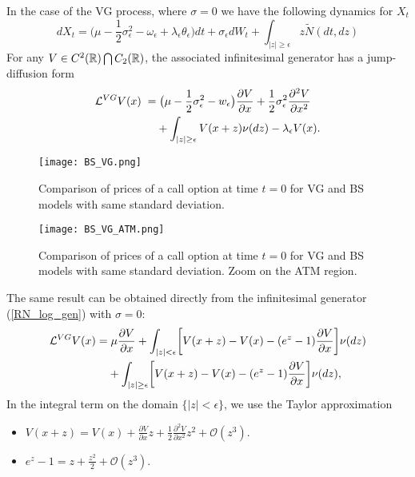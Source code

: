 In the case of the VG process, where $\sigma = 0$ we have the following dynamics for $X_t$
\begin{equation}\label{log_sde_VG}
dX_t = \biggl( \mu - \frac{1}{2} \sigma_{\epsilon}^2 - \omega_{\epsilon} + \lambda_{\epsilon} \theta_{\epsilon}  \biggr) dt 
       + \sigma_{\epsilon} dW_t + \int_{|z|\geq \epsilon} z \tilde N(dt,dz)
\end{equation}
For any $V\in C^2(\mathbb{R}) \bigcap C_2(\mathbb{R})$, the associated infinitesimal generator has a jump-diffusion form
\begin{align}\label{VG_inf_gen}
\mathcal{L}^{VG} V(x) \; =& \; \bigl( \mu-\frac{1}{2}\sigma_{\epsilon}^2 - w_{\epsilon} \bigr) \frac{\partial V}{\partial x} 
+ \frac{1}{2}\sigma_{\epsilon}^2 \frac{\partial^2 V}{\partial x^2} \\ \nonumber
&+ \int_{|z| \geq \epsilon} V(x+z) \nu(dz) - \lambda_{\epsilon} V(x).
\end{align}
\begin{figure}[t]
   \centering
   \texttt{[image: BS\_VG.png]}
   \caption{Comparison of prices of a call option at time $t=0$ for VG and BS models with same standard deviation.}
   \label{BS_VG} 
 \end{figure}
 \begin{figure}[t]
   \texttt{[image: BS\_VG\_ATM.png]}
   \caption{Comparison of prices of a call option at time $t=0$ for VG and BS models with same standard deviation. Zoom on the ATM region.}
   \label{BS_VG_ATM}
\end{figure}
The same result can be obtained directly from the infinitesimal generator (\ref{RN_log_gen}) with $\sigma =0$:
\begin{align*}
\mathcal{L}^{VG} V(x) =& \; \mu \frac{\partial V}{\partial x}
+ \int_{|z| < \epsilon}
\biggl[ V(x+z) - V(x) - (e^z-1)\frac{\partial V}{\partial x} \biggr] \nu(dz) \\
&+ \int_{|z| \geq \epsilon}
\biggl[ V(x+z) - V(x) - (e^z-1)\frac{\partial V}{\partial x} \biggr] \nu(dz),
\end{align*}
In the integral term on the domain $\{ |z|<\epsilon \}$, we use the Taylor approximation
\begin{itemize}
 \item $V(x+z) = V(x) + \frac{\partial V}{\partial x} z + \frac{1}{2} \frac{\partial^2 V}{\partial x^2} z^2 + \mathcal{O}(z^3)$.
 \item $e^z-1 = z + \frac{z^2}{2} + \mathcal{O}(z^3) $.
\end{itemize}
